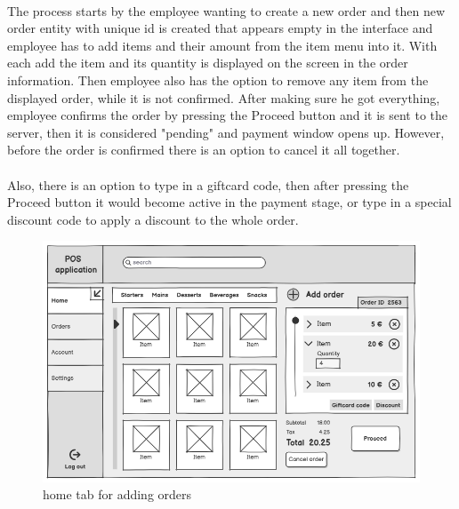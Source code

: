\documentclass{article}
\begin{document}
    \paragraph{}The process starts by the employee wanting to create a new order and then new order entity with unique id is created that appears empty in the interface and employee has to add items and their amount from the item menu into it. With each add the item and its quantity is displayed on the screen in the order information. Then employee also has the option to remove any item from the displayed order, while it is not confirmed. After making sure he got everything, employee confirms the order by pressing the Proceed button and it is sent to the server, then it is considered "pending" and payment window opens up. However, before the order is confirmed there is an option to cancel it all together.
    \paragraph{}Also, there is an option to type in a giftcard code, then after pressing the Proceed button it would become active in the payment stage, or type in a special discount code to apply a discount to the whole order.
     \begin{figure}[H]
        \centering
        \includegraphics[width=0.9\linewidth]{PSP/lab-1/mockups/hometab.png}
        \caption{home tab for adding orders}
        \label{}
    \end{figure}
    
\end{document}
